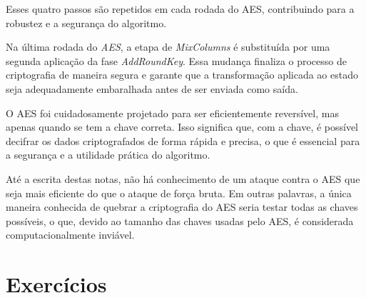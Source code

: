 Esses quatro passos são repetidos em cada rodada do AES, contribuindo para a robustez e a segurança do algoritmo.

Na última rodada do \textit{AES}, a etapa de \textit{MixColumns} é substituída por uma segunda aplicação da fase \textit{AddRoundKey}.
Essa mudança finaliza o processo de criptografia de maneira segura e garante que a transformação aplicada ao estado seja adequadamente embaralhada antes de ser enviada como saída.

O AES foi cuidadosamente projetado para ser eficientemente reversível, mas apenas quando se tem a chave correta.
Isso significa que, com a chave, é possível decifrar os dados criptografados de forma rápida e precisa, o que é essencial para a segurança e a utilidade prática do algoritmo.

Até a escrita destas notas, não há conhecimento de um ataque contra o AES que seja mais eficiente do que o ataque de força bruta.
Em outras palavras, a única maneira conhecida de quebrar a criptografia do AES seria testar todas as chaves possíveis, o que, devido ao tamanho das chaves usadas pelo AES, é considerada computacionalmente inviável.





\section{Exercícios}
\label{sec:exercicios}

